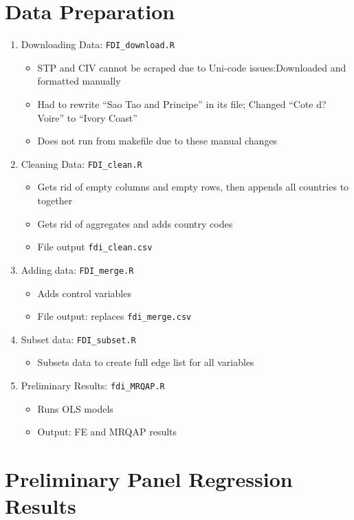 \documentclass{article}
\begin{document}
\section{Data Preparation}
\begin{enumerate}
	\item Downloading Data: \texttt{FDI\_download.R}
		\begin{itemize}
			\item{STP and CIV cannot be scraped due to Uni-code issues:Downloaded and formatted manually}
			\item{Had to rewrite ``Sao Tao and Principe'' in its file; Changed ``Cote d?Voire'' to ``Ivory Coast''}
			\item{Does not run from makefile due to these manual changes}
		\end{itemize}
	\item Cleaning Data: \texttt{FDI\_clean.R}
		\begin{itemize}
			\item{Gets rid of empty columns and empty rows, then appends all countries to together}
			\item{Gets rid of aggregates and adds country codes}
			\item File output \texttt{fdi\_clean.csv}
		\end{itemize}
	\item Adding data: \texttt{FDI\_merge.R}
		\begin{itemize}
			\item{Adds control variables}
			\item File output: replaces \texttt{fdi\_merge.csv} 
		\end{itemize}
	\item Subset data: \texttt{FDI\_subset.R}
		\begin{itemize}
			\item{Subsets data to create full edge list for all variables}
		\end{itemize}
	\item Preliminary Results: \texttt{fdi\_MRQAP.R}
		\begin{itemize}
			\item{Runs OLS models}
			\item Output: FE and MRQAP results 
		\end{itemize}

		
\end{enumerate}

\section{Preliminary Panel Regression Results}
\end{document}
